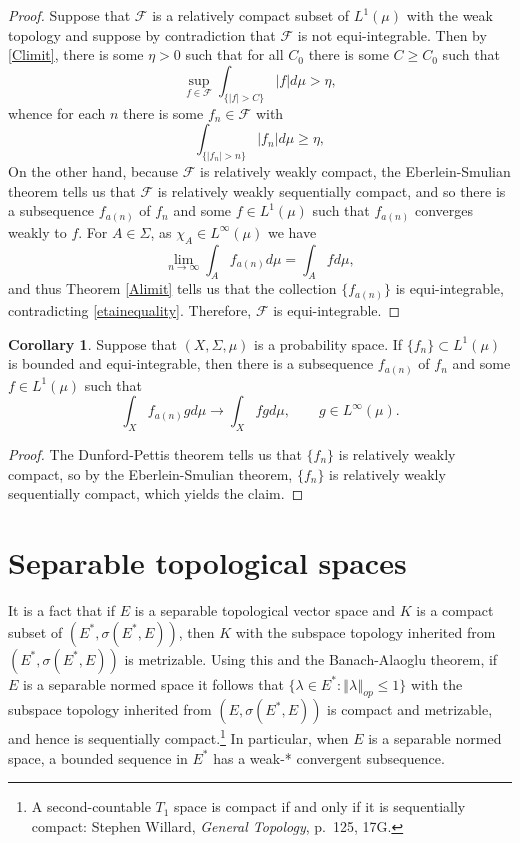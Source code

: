 \documentclass{article}
\newcommand{\norm}[1]{\left\Vert #1 \right\Vert}
\theoremstyle{definition}
\newtheorem{corollary}[theorem]{Corollary}
\theoremstyle{definition}
\begin{document}
\begin{proof}
Suppose that $\mathscr{F}$ is a relatively compact subset of $L^1(\mu)$ with the weak topology and suppose
by contradiction that $\mathscr{F}$ is not equi-integrable. 
Then by \eqref{Climit}, there is some $\eta >0$  such that for all $C_0$ there is some $C \geq C_0$ such that
\[
\sup_{f \in \mathscr{F}} \int_{\{|f| > C\}} |f| d\mu > \eta,
\]
whence for each $n$ there is some $f_n \in \mathscr{F}$ with
\begin{equation}
\int_{\{|f_n|>n\}} |f_n| d\mu \geq \eta,
\label{etainequality}
\end{equation}
On the other hand, because $\mathscr{F}$ is relatively weakly compact, the Eberlein-Smulian theorem tells us that
$\mathscr{F}$ is relatively weakly sequentially compact, and so there is a subsequence $f_{a(n)}$ of $f_n$ and some
$f \in L^1(\mu)$ such that $f_{a(n)}$ converges weakly to $f$. 
For  $A \in \Sigma$, as $\chi_A \in L^\infty(\mu)$ we have
\[
\lim_{n \to \infty} \int_A f_{a(n)} d\mu = \int_A f d\mu,
\]
and thus Theorem \ref{Alimit}  tells us that the collection $\{f_{a(n)}\}$ is equi-integrable, contradicting \eqref{etainequality}.
Therefore, $\mathscr{F}$ is equi-integrable.
\end{proof}


\begin{corollary}
Suppose that $(X,\Sigma,\mu)$ is a probability space. If $\{f_n\} \subset L^1(\mu)$ is
bounded and equi-integrable, then there is a subsequence $f_{a(n)}$ of $f_n$ and some $f \in L^1(\mu)$ such that
\[
\int_X f_{a(n)} g d\mu \to \int_X f g d\mu, \qquad g \in L^\infty(\mu).
\]
\end{corollary}
\begin{proof}
The Dunford-Pettis theorem tells us that $\{f_n\}$ is relatively weakly compact, so by the Eberlein-Smulian theorem,
$\{f_n\}$ is relatively weakly sequentially compact, which yields the claim.
\end{proof}



\section{Separable topological spaces}
It is a fact that if $E$ is a separable topological vector space and $K$ is a compact subset of
$(E^*,\sigma(E^*,E))$, then $K$ with the subspace topology inherited from
$(E^*,\sigma(E^*,E))$ is metrizable. Using this and the Banach-Alaoglu theorem, if
$E$ is a separable normed space it follows that
$\{\lambda \in E^*: \norm{\lambda}_{op} \leq 1\}$
with the subspace topology inherited from
$(E,\sigma(E^*,E))$ is compact and metrizable, 
and hence is sequentially compact.\footnote{A second-countable $T_1$ space is compact if and only if it is
sequentially compact: Stephen Willard, {\em General Topology}, p.~125, 17G.}
In particular, when $E$ is a separable normed space, a bounded sequence in $E^*$ has a weak-* convergent subsequence.
\end{document}
